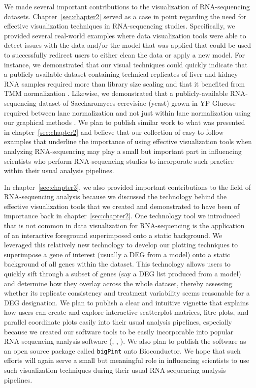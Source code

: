 \documentclass[11pt,a4paper,oldfontcommands,openany]{memoir}
\numberwithin{equation}{section} %
\newcommand{\pkg}[1]{{\texttt{#1}}}
\begin{document}
We made several important contributions to the visualization of RNA-sequencing datasets. Chapter~\ref{sec:chapter2} served as a case in point regarding the need for effective visualization techniques in RNA-sequencing studies. Specifically, we provided several real-world examples where data visualization tools were able to detect issues with the data and/or the model that was applied that could be used to successfully redirect users to either clean the data or apply a new model. For instance, we demonstrated that our visual techniques could quickly indicate that a publicly-available dataset containing technical replicates of liver and kidney RNA samples required more than library size scaling and that it benefited from TMM normalization \citep{Marioni}. Likewise, we demonstrated that a publicly-available RNA-sequencing dataset of Saccharomyces cerevisiae (yeast) grown in YP-Glucose required between lane normalization and not just within lane normalization using our graphical methods \cite{Risso}. We plan to publish similar work to what was presented in chapter~\ref{sec:chapter2} and believe that our collection of easy-to-follow examples that underline the importance of using effective visualization tools when analyzing RNA-sequencing may play a small but important part in influencing scientists who perform RNA-sequencing studies to incorporate such practice within their usual analysis pipelines.

In chapter~\ref{sec:chapter3}, we also provided important contributions to the field of RNA-sequencing analysis because we discussed the technology behind the effective visualization tools that we created and demonstrated to have been of importance back in chapter~\ref{sec:chapter2}. One technology tool we introduced that is not common in data visualization for RNA-sequencing is the application of an interactive foreground superimposed onto a static background. We leveraged this relatively new technology to develop our plotting techniques to superimpose a gene of interest (usually a DEG from a model) onto a static background of all genes within the dataset. This technology allows users to quickly sift through a subset of genes (say a DEG list produced from a model) and determine how they overlay across the whole dataset, thereby assessing whether its replicate consistency and treatment variability seems reasonable for a DEG designation. We plan to publish a clear and intuitive vignette that explains how users can create and explore interactive scatterplot matrices, litre plots, and parallel coordinate plots easily into their usual analysis pipelines, especially because we created our software tools to be easily incorporable into popular RNA-sequencing analysis software (\citealt{deseq2}, \citealt{edger}, \citealt{limma}). We also plan to publish the software as an open source package called \pkg{bigPint} onto Bioconductor. We hope that such efforts will again serve a small but meaningful role in influencing scientists to use such visualization techniques during their usual RNA-sequencing analysis pipelines.
\end{document}
